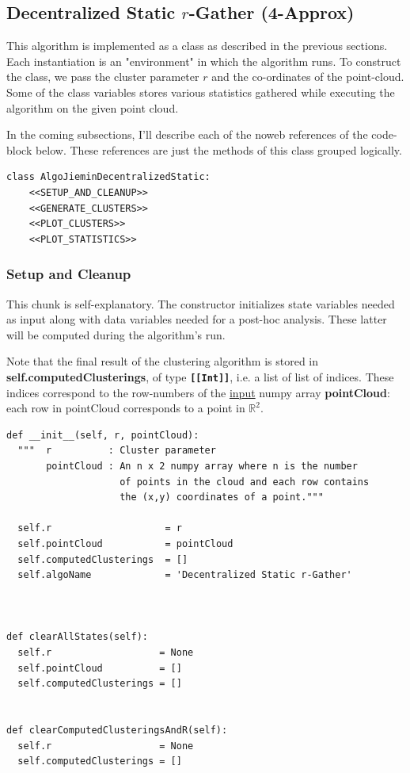 \documentclass[11pt]{article}
\begin{document}
\subsection{Decentralized Static $r$-Gather (4-Approx)}
\label{sec-3-2}


This algorithm is implemented as a class as described in the previous sections. Each instantiation 
is an "environment" in which the algorithm runs. To construct the class, we pass 
the cluster parameter $r$ and the co-ordinates of the point-cloud. Some of the class variables stores 
various statistics gathered while executing the algorithm on the given point cloud.

In the coming subsections, I'll describe each of the noweb references of the code-block below. 
These references are just the methods of this class grouped logically.  



\begin{verbatim}
class AlgoJieminDecentralizedStatic:
    <<SETUP_AND_CLEANUP>>
    <<GENERATE_CLUSTERS>> 
    <<PLOT_CLUSTERS>>  
    <<PLOT_STATISTICS>>
\end{verbatim}

\subsubsection{Setup and Cleanup}
\label{sec-3-2-1}

This chunk is  self-explanatory. The constructor initializes state variables needed as input
along with data variables needed for a post-hoc analysis. These latter will be computed during the 
algorithm's run.  

Note that the final result of the clustering algorithm is stored in \textbf{self.computedClusterings},  
of type \textbf{\verb~[[Int]]~}, i.e. a list of list of indices. These indices correspond to the row-numbers 
of the \uline{input} numpy array \textbf{pointCloud}: each row in pointCloud corresponds to a point in $\mathbb{R}^2$. 

\begin{verbatim}
def __init__(self, r, pointCloud):
  """  r          : Cluster parameter
       pointCloud : An n x 2 numpy array where n is the number 
                    of points in the cloud and each row contains 
                    the (x,y) coordinates of a point."""

  self.r                    = r     
  self.pointCloud           = pointCloud  
  self.computedClusterings  = []  
  self.algoName             = 'Decentralized Static r-Gather'



def clearAllStates(self):
  self.r                   = None
  self.pointCloud          = [] 
  self.computedClusterings = []


def clearComputedClusteringsAndR(self):
  self.r                   = None
  self.computedClusterings = []
\end{verbatim}
\end{document}

